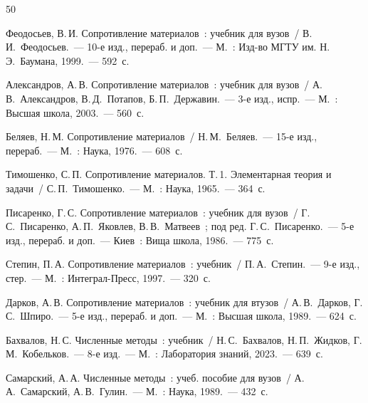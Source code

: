 \newpage
\begin{thebibliography}{50}



Феодосьев, В.\,И. Сопротивление материалов~: учебник для вузов~/
В.\,И.~Феодосьев.~--- 10-е изд., перераб. и доп.~---
М.~: Изд-во МГТУ им. Н.\,Э.~Баумана, 1999.~--- 592~с.

Александров, А.\,В. Сопротивление материалов~: учебник для вузов~/
А.\,В.~Александров, В.\,Д.~Потапов, Б.\,П.~Державин.~---
3-е изд., испр.~--- М.~: Высшая школа, 2003.~--- 560~с.

Беляев, Н.\,М. Сопротивление материалов~/
Н.\,М.~Беляев.~--- 15-е изд., перераб.~---
М.~: Наука, 1976.~--- 608~с.

Тимошенко, С.\,П. Сопротивление материалов. Т.\,1. Элементарная теория и задачи~/
С.\,П.~Тимошенко.~--- М.~: Наука, 1965.~--- 364~с.

Писаренко, Г.\,С. Сопротивление материалов~: учебник для вузов~/
Г.\,С.~Писаренко, А.\,П.~Яковлев, В.\,В.~Матвеев~;
под ред. Г.\,С.~Писаренко.~--- 5-е изд., перераб. и доп.~---
Киев~: Вища школа, 1986.~--- 775~с.

Степин, П.\,А. Сопротивление материалов~: учебник~/
П.\,А.~Степин.~--- 9-е изд., стер.~---
М.~: Интеграл-Пресс, 1997.~--- 320~с.

Дарков, А.\,В. Сопротивление материалов~: учебник для втузов~/
А.\,В.~Дарков, Г.\,С.~Шпиро.~--- 5-е изд., перераб. и доп.~---
М.~: Высшая школа, 1989.~--- 624~с.


Бахвалов, Н.\,С. Численные методы~: учебник~/
Н.\,С.~Бахвалов, Н.\,П.~Жидков, Г.\,М.~Кобельков.~---
8-е изд.~--- М.~: Лаборатория знаний, 2023.~--- 639~с.

Самарский, А.\,А. Численные методы~: учеб. пособие для вузов~/
А.\,А.~Самарский, А.\,В.~Гулин.~--- М.~: Наука, 1989.~--- 432~с.




\end{thebibliography}
